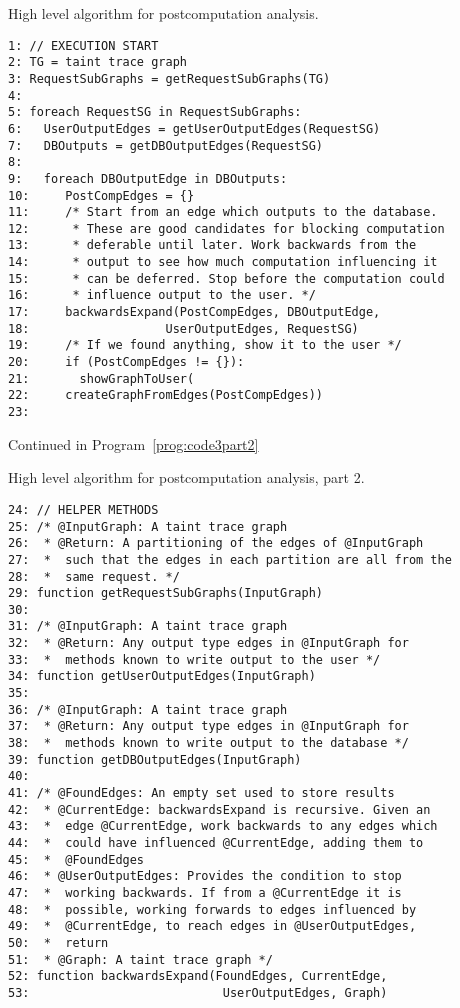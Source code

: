 \documentclass[msc,oneside]{ubcthesis}
\begin{document}
\begin{Program}
  \caption{\label{prog:code3} High level algorithm for postcomputation analysis.}
\begin{verbatim}
1: // EXECUTION START
2: TG = taint trace graph
3: RequestSubGraphs = getRequestSubGraphs(TG)
4: 
5: foreach RequestSG in RequestSubGraphs:
6:   UserOutputEdges = getUserOutputEdges(RequestSG)
7:   DBOutputs = getDBOutputEdges(RequestSG)
8:   
9:   foreach DBOutputEdge in DBOutputs:
10:     PostCompEdges = {}
11:     /* Start from an edge which outputs to the database.
12:      * These are good candidates for blocking computation 
13:      * deferable until later. Work backwards from the 
14:      * output to see how much computation influencing it 
15:      * can be deferred. Stop before the computation could 
16:      * influence output to the user. */
17:     backwardsExpand(PostCompEdges, DBOutputEdge, 
18:                   UserOutputEdges, RequestSG)
19:     /* If we found anything, show it to the user */
20:     if (PostCompEdges != {}):
21:       showGraphToUser(
22:     createGraphFromEdges(PostCompEdges))
23:   
\end{verbatim}
Continued in Program~\ref{prog:code3part2}
\end{Program}
\begin{Program}
  \caption{\label{prog:code3part2} High level algorithm for postcomputation analysis, part 2.}
\begin{verbatim}
24: // HELPER METHODS
25: /* @InputGraph: A taint trace graph
26:  * @Return: A partitioning of the edges of @InputGraph
27:  *  such that the edges in each partition are all from the
28:  *  same request. */
29: function getRequestSubGraphs(InputGraph)
30: 
31: /* @InputGraph: A taint trace graph
32:  * @Return: Any output type edges in @InputGraph for 
33:  *  methods known to write output to the user */
34: function getUserOutputEdges(InputGraph)
35: 
36: /* @InputGraph: A taint trace graph
37:  * @Return: Any output type edges in @InputGraph for 
38:  *  methods known to write output to the database */
39: function getDBOutputEdges(InputGraph)
40: 
41: /* @FoundEdges: An empty set used to store results
42:  * @CurrentEdge: backwardsExpand is recursive. Given an 
43:  *  edge @CurrentEdge, work backwards to any edges which
44:  *  could have influenced @CurrentEdge, adding them to 
45:  *  @FoundEdges
46:  * @UserOutputEdges: Provides the condition to stop 
47:  *  working backwards. If from a @CurrentEdge it is 
48:  *  possible, working forwards to edges influenced by
49:  *  @CurrentEdge, to reach edges in @UserOutputEdges, 
50:  *  return
51:  * @Graph: A taint trace graph */
52: function backwardsExpand(FoundEdges, CurrentEdge, 
53:                           UserOutputEdges, Graph)
\end{verbatim}
\end{Program}
\end{document}
